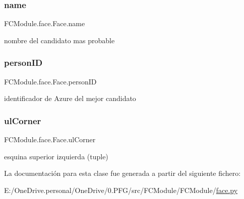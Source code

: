\subsubsection{\texorpdfstring{name}{name}}
{\footnotesize\ttfamily F\+C\+Module.\+face.\+Face.\+name}



nombre del candidato mas probable 

\mbox{\label{class_f_c_module_1_1face_1_1_face_a9eb1f17f0ed52af706762346be0f9a52}} 
\subsubsection{\texorpdfstring{person\+ID}{personID}}
{\footnotesize\ttfamily F\+C\+Module.\+face.\+Face.\+person\+ID}



identificador de Azure del mejor candidato 

\mbox{\label{class_f_c_module_1_1face_1_1_face_a23e2d922b8ff5921a8c776d0a2f2f61a}} 
\subsubsection{\texorpdfstring{ul\+Corner}{ulCorner}}
{\footnotesize\ttfamily F\+C\+Module.\+face.\+Face.\+ul\+Corner}



esquina superior izquierda (tuple) 



La documentación para esta clase fue generada a partir del siguiente fichero\+:\begin{DoxyCompactItemize}
\item 
E\+:/\+One\+Drive.\+personal/\+One\+Drive/0.\+P\+F\+G/src/\+F\+C\+Module/\+F\+C\+Module/\mbox{\hyperlink{face_8py}{face.\+py}}\end{DoxyCompactItemize}
